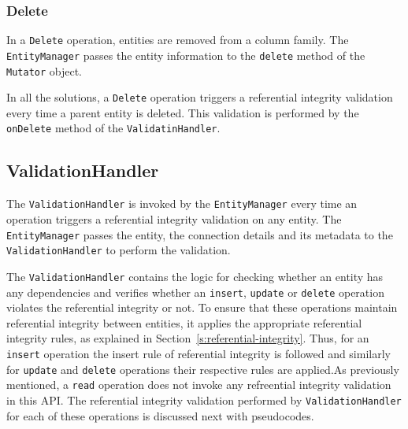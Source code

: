 		\subsubsection{Delete}\label{ss:delete}
		In a  \texttt{Delete} operation, entities are removed from a column
		family. The \texttt{EntityManager} passes the entity
		information to the \texttt{delete} method of the \texttt{Mutator} object.
		
		In all the solutions,  a \texttt{Delete} operation triggers a referential
		integrity validation every time a parent entity is deleted. This validation is performed by
 		the \texttt{onDelete} method of the \texttt{ValidatinHandler}.
% 		
% 		
		
		\subsection{ValidationHandler}\label{ss:VH}
		The \texttt{ValidationHandler} is invoked by the \texttt{EntityManager} every time
		an operation triggers a
		referential integrity validation on any entity. 
		The \texttt{EntityManager} passes the entity,  the connection details and its
		metadata to the \texttt{ValidationHandler} to perform the validation.  
		
		The \texttt{ValidationHandler} contains the logic for checking whether an entity
		has any dependencies and verifies whether an \texttt{insert}, \texttt{update} or
		\texttt{delete} operation  violates the referential integrity or not.
		To ensure that these operations maintain referential integrity between entities,
		it applies the appropriate referential integrity rules, as explained in
		Section~\ref{s:referential-integrity}. Thus, for an \texttt{insert} operation
		the insert rule of referential integrity is followed and similarly for
		\texttt{update} and \texttt{delete} operations their respective rules are
		applied.As previously mentioned, a \texttt{read} operation does not invoke any
		refreential integrity validation in this \ac{API}. The referential
		integrity validation performed by \texttt{ValidationHandler} for each of these
		operations is discussed next with pseudocodes.
		
